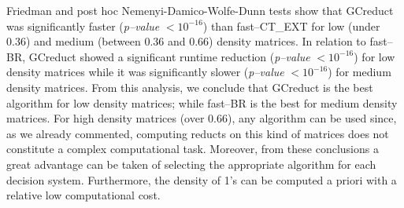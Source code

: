 \documentclass[number,preprint,review,12pt]{elsarticle}
\begin{document}
	Friedman and post hoc Nemenyi-Damico-Wolfe-Dunn tests show that GCreduct was significantly faster (\textit{p--value} $< 10^{-16}$) than fast--CT\_EXT for low (under 0.36) and medium (between 0.36 and 0.66) density matrices. In relation to fast--BR, GCreduct showed a significant runtime reduction (\textit{p--value} $< 10^{-16}$) for low density matrices while it was significantly slower (\textit{p--value} $< 10^{-16}$) for medium density matrices. From this analysis, we conclude that GCreduct is the best algorithm for low density matrices; while fast--BR is the best for medium density matrices. For high density matrices (over 0.66), any algorithm can be used since, as we already commented, computing reducts on this kind of matrices does not constitute a complex computational task. Moreover, from these conclusions a great advantage can be taken of selecting the appropriate algorithm for each decision system. Furthermore, the density of 1's can be computed a priori with a relative low computational cost.
		
\end{document}

